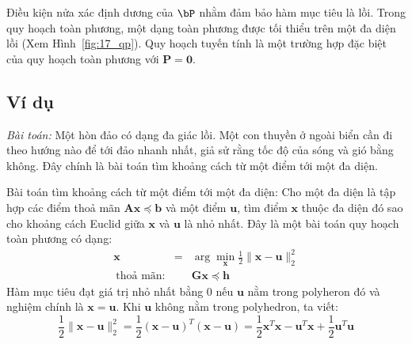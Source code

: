 
Điều kiện nửa xác định dương của $\bP$ nhằm đảm bảo hàm mục tiêu là lồi.
Trong quy hoạch toàn phương, một dạng toàn phương được tối thiểu trên một đa diện lồi (Xem
Hình~\ref{fig:17_qp}). Quy hoạch tuyến tính là một trường hợp đặc biệt của quy hoạch toàn phương với
$\mathbf{P} = \mathbf{0}$.
 

 
\subsection{Ví dụ}
\textit{Bài toán:} Một hòn đảo có dạng đa giác
lồi. Một con thuyền ở ngoài biển cần đi theo hướng nào để tới đảo nhanh
nhất, giả sử rằng tốc độ của sóng và gió bằng không. Đây chính là bài toán tìm khoảng cách từ
một điểm tới một đa diện. 
 
Bài toán tìm khoảng cách từ một điểm tới một đa diện: Cho
một đa diện là tập hợp các điểm thoả mãn $\mathbf{Ax} \preceq \mathbf{b}$ và
một điểm $\mathbf{u}$, tìm điểm $\mathbf{x}$ thuộc đa diện đó sao cho khoảng
cách Euclid giữa $\mathbf{x}$ và $\mathbf{u}$ là nhỏ nhất. Đây là một bài
toán quy hoạch toàn phương có dạng: 
\begin{eqnarray*} 
\mathbf{x} &=& \arg\min_{\mathbf{x}} \frac{1}{2}\|\mathbf{x} - \mathbf{u}\|_2^2 \\\ 
\text{thoả mãn:} &&\mathbf{Gx} \preceq \mathbf{h}
\end{eqnarray*} 
Hàm mục tiêu đạt giá trị nhỏ nhất bằng 0 nếu $\mathbf{u}$ nằm trong polyheron đó
và nghiệm chính là $\mathbf{x} = \mathbf{u}$. Khi $\mathbf{u}$ không nằm trong
polyhedron, ta viết:
\begin{equation*} 
\frac{1}{2} \|\mathbf{x} - \mathbf{u}\|_2^2 = \frac{1}{2} (\mathbf{x} - \mathbf{u})^T(\mathbf{x} - \mathbf{u}) = \frac{1}{2} \mathbf{x}^T\mathbf{x} - \mathbf{u}^T\mathbf{x} + \frac{1}{2} \mathbf{u}^T\mathbf{u} 
\end{equation*} 

